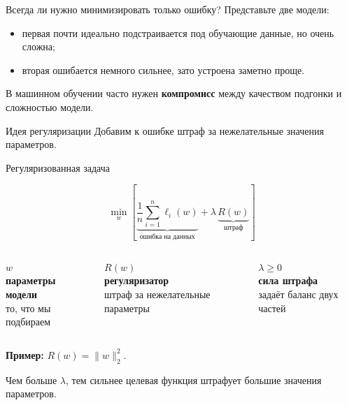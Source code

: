 \documentclass[aspectratio=169,10pt]{beamer}
\newcommand{\loss}{\ell}
\begin{document}
\begin{frame}{Всегда ли нужно минимизировать только ошибку?}
Представьте две модели:
\begin{itemize}
  \item первая почти идеально подстраивается под обучающие данные, но очень сложна;
  \item вторая ошибается немного сильнее, зато устроена заметно проще.
\end{itemize}

\vspace{0.6em}
В машинном обучении часто нужен \textbf{компромисс} между качеством подгонки и сложностью модели.

\begin{alertblock}{Идея регуляризации}
Добавим к ошибке штраф за нежелательные значения параметров.
\end{alertblock}
\end{frame}

\begin{frame}{Регуляризованная задача}
\vspace{0.15em}

\centering
\[
\boxed{
\min_w
\left[
\underbrace{\frac1n\sum_{i=1}^{n}\loss_i(w)}_{\text{ошибка на данных}}
+
\lambda\,
\underbrace{R(w)}_{\text{штраф}}
\right]
}
\]

\vspace{0.35em}
\begin{columns}[T,onlytextwidth]
\centering
{\Large\color{HSEblue}$w$}\\[0.15em]
\textbf{параметры модели}\\[-0.05em]
\small то, что мы подбираем

\centering
{\Large\color{HSEblue}$R(w)$}\\[0.15em]
\textbf{регуляризатор}\\[-0.05em]
\small штраф за нежелательные параметры

\centering
{\Large\color{HSEblue}$\lambda\ge 0$}\\[0.15em]
\textbf{сила штрафа}\\[-0.05em]
\small задаёт баланс двух частей
\end{columns}

\vspace{0.45em}
\raggedright
\textbf{\color{HSEblue}Пример:}\quad
$R(w)=\|w\|_2^2$.

\vspace{0.25em}
\small Чем больше $\lambda$, тем сильнее целевая функция штрафует большие значения параметров.
\end{frame}
\end{document}
